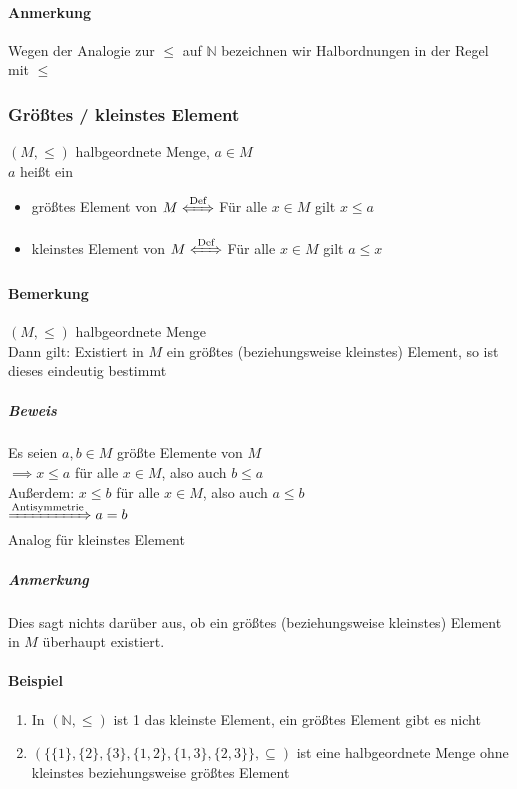 \documentclass[a4paper]{scrartcl}
\theoremstyle{definition}
\theoremstyle{plain}
\theoremstyle{plain}
\theoremstyle{remark}
\theoremstyle{remark}
\theoremstyle{remark}
\theoremstyle{remark}
\theoremstyle{remark}
\begin{document}
\paragraph{Anmerkung}
\label{sec-2-5-3-2}
Wegen der Analogie zur $\leq$ auf $\mathbb{N}$ bezeichnen wir Halbordnungen in der Regel mit $\leq$
\subsubsection{Größtes / kleinstes Element}
\label{sec-2-5-4}
$(M, \leq)$ halbgeordnete Menge, $a\in M$ \\
    $a$ heißt ein
\begin{itemize}
\item größtes Element von $M\xLeftrightarrow{\text{Def}}$ Für alle $x\in M$ gilt $x\leq a$
\item kleinstes Element von $M\xLeftrightarrow{\text{Def}}$ Für alle $x\in M$ gilt $a\leq x$
\end{itemize}
\paragraph{Bemerkung}
\label{sec-2-5-4-1}
$(M,\leq)$ halbgeordnete Menge \\
     Dann gilt: Existiert in $M$ ein größtes (beziehungsweise kleinstes) Element, so ist dieses eindeutig bestimmt
\subparagraph{Beweis}
\label{sec-2-5-4-1-1}
Es seien $a,b\in M$ größte Elemente von $M$ \\
      $\implies x\leq a$ für alle $x\in M$, also auch $b\leq a$ \\
      Außerdem: $x \leq b$ für alle $x\in M$, also auch $a\leq b$ \\
      $\xRightarrow{\text{Antisymmetrie}} a = b$ \\
      Analog für kleinstes Element
\subparagraph{Anmerkung}
\label{sec-2-5-4-1-2}
Dies sagt nichts darüber aus, ob ein größtes (beziehungsweise kleinstes) Element in $M$ überhaupt existiert.
\paragraph{Beispiel}
\label{sec-2-5-4-2}
\begin{enumerate}
\item In $(\mathbb{N},\leq)$ ist 1 das kleinste Element, ein größtes Element gibt es nicht
\item $(\{\{1\},\{2\},\{3\},\{1,2\},\{1,3\},\{2,3\}\}, \subseteq)$ ist eine halbgeordnete Menge ohne kleinstes beziehungsweise größtes Element
\end{enumerate}
\end{document}
